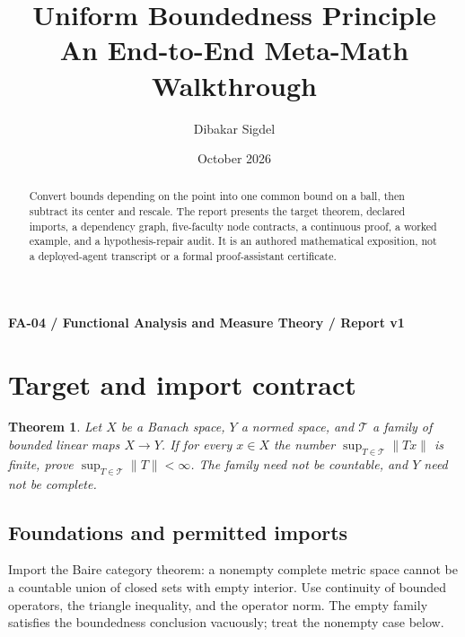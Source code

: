 \documentclass[preprint,12pt,aps,pra,showkeys,amsmath,amssymb,superscriptaddress,floatfix]{revtex4-2}
\newtheorem{theorem}{Theorem}[section]
\theoremstyle{definition}
\theoremstyle{remark}
\begin{document}
\title{Uniform Boundedness Principle\\[4pt]\large An End-to-End Meta-Math Walkthrough}

\author{Dibakar Sigdel}


\date{October 2026}

\begin{abstract}

Convert bounds depending on the point into one common bound on a ball,
then subtract its center and rescale. The report presents the target
theorem, declared imports, a dependency graph, five-faculty node
contracts, a continuous proof, a worked example, and a hypothesis-repair
audit. It is an authored mathematical exposition, not a deployed-agent
transcript or a formal proof-assistant certificate.

\end{abstract}\maketitle\linespread{1.12}\selectfont

\noindent\textbf{FA-04 / Functional Analysis and Measure Theory / Report v1}

\section{Target and import contract}

\begin{theorem}

Let \(X\) be a Banach space, \(Y\) a normed space, and \(\mathcal T\) a
family of bounded linear maps \(X\to Y\). If for every \(x\in X\) the
number \(\sup_{T\in\mathcal T}\|Tx\|\) is finite, prove
\(\sup_{T\in\mathcal T}\|T\|<\infty\). The family need not be countable,
and \(Y\) need not be complete.

\end{theorem}

\subsection{Foundations and permitted imports}

Import the Baire category theorem: a nonempty complete metric space
cannot be a countable union of closed sets with empty interior. Use
continuity of bounded operators, the triangle inequality, and the
operator norm. The empty family satisfies the boundedness conclusion
vacuously; treat the nonempty case below.
\end{document}
